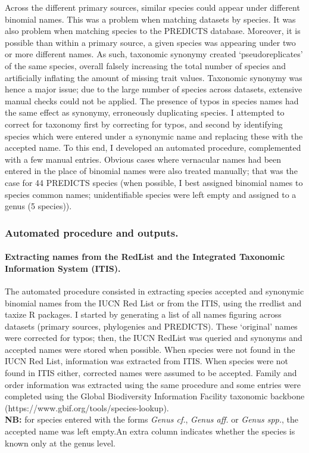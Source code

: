 Across the different primary sources, similar species could appear under different binomial names. This was a problem when matching datasets by species. It was also problem when matching species to the PREDICTS database. Moreover, it is possible than within a primary source, a given species was appearing under two or more different names. As such, taxonomic synonymy created `pseudoreplicates' of the same species, overall falsely increasing the total number of species and artificially inflating the amount of missing trait values. Taxonomic synonymy was hence a major issue; due to the large number of species across datasets, extensive manual checks could not be applied. The presence of typos in species names had the same effect as synonymy, erroneously duplicating species. I attempted to correct for taxonomy first by correcting for typos, and second by identifying species which were entered under a synonymic name and replacing these with the accepted name. To this end, I developed an automated procedure, complemented with a few manual entries. Obvious cases where vernacular names had been entered in the place of binomial names were also treated manually; that was the case for 44 PREDICTS species (when possible, I best assigned binomial names to species common names; unidentifiable species were left empty and assigned to a genus (5 species)).

\subsubsection{Automated procedure and outputs.}
\paragraph{Extracting names from the RedList and the Integrated Taxonomic Information System (ITIS).}
The automated procedure consisted in extracting species accepted and synonymic binomial names from the IUCN Red List or from the ITIS, using the rredlist and taxize R packages. I started by generating a list of all names figuring across datasets (primary sources, phylogenies and PREDICTS). These `original' names were corrected for typos; then, the IUCN RedList was queried and synonyms and accepted names were stored when possible. When species were not found in the IUCN Red List, information was extracted from ITIS. When species were not found in ITIS either, corrected names were assumed to be accepted. Family and order information was extracted using the same procedure and some entries were completed using the Global Biodiversity Information Facility taxonomic backbone (https://www.gbif.org/tools/species-lookup).\\
\textbf{NB:} for species entered with the forms \textit{Genus cf.}, \textit{Genus aff.} or \textit{Genus spp.}, the accepted name was left empty.An extra column indicates whether the species is known only at the genus level.

